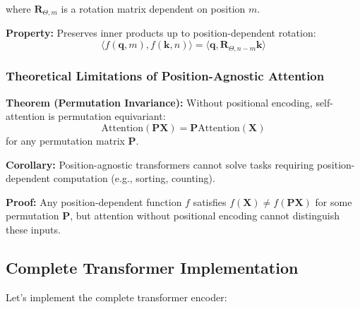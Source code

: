 \documentclass[11pt]{article}
\begin{document}
where $\mathbf{R}_{\Theta,m}$ is a rotation matrix dependent on position $m$.

\textbf{Property:} Preserves inner products up to position-dependent rotation:
\begin{equation}
\langle f(\mathbf{q}, m), f(\mathbf{k}, n) \rangle = \langle \mathbf{q}, \mathbf{R}_{\Theta,n-m} \mathbf{k} \rangle
\end{equation}

\subsubsection{Theoretical Limitations of Position-Agnostic Attention}

\textbf{Theorem (Permutation Invariance):} Without positional encoding, self-attention is permutation equivariant:
\begin{equation}
\text{Attention}(\mathbf{P}\mathbf{X}) = \mathbf{P}\text{Attention}(\mathbf{X})
\end{equation}
for any permutation matrix $\mathbf{P}$.

\textbf{Corollary:} Position-agnostic transformers cannot solve tasks requiring position-dependent computation (e.g., sorting, counting).

\textbf{Proof:} Any position-dependent function $f$ satisfies $f(\mathbf{X}) \neq f(\mathbf{P}\mathbf{X})$ for some permutation $\mathbf{P}$, but attention without positional encoding cannot distinguish these inputs.

\subsection{Complete Transformer Implementation}

Let's implement the complete transformer encoder:
\end{document}
